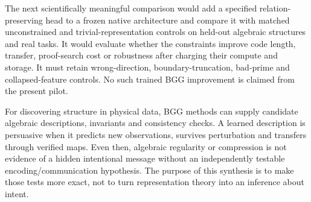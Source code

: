 The next scientifically meaningful comparison would add a specified relation-preserving head to a frozen native architecture and compare it with matched unconstrained and trivial-representation controls on held-out algebraic structures and real tasks. It would evaluate whether the constraints improve code length, transfer, proof-search cost or robustness after charging their compute and storage. It must retain wrong-direction, boundary-truncation, bad-prime and collapsed-feature controls. No such trained BGG improvement is claimed from the present pilot.

For discovering structure in physical data, BGG methods can supply candidate algebraic descriptions, invariants and consistency checks. A learned description is persuasive when it predicts new observations, survives perturbation and transfers through verified maps. Even then, algebraic regularity or compression is not evidence of a hidden intentional message without an independently testable encoding/communication hypothesis. The purpose of this synthesis is to make those tests more exact, not to turn representation theory into an inference about intent.
